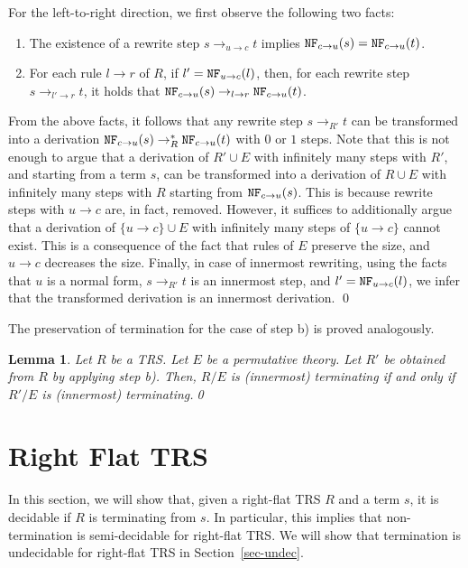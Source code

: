 \documentclass{LMCS}
\theoremstyle{plain}
\newtheorem{lemma}[thm]{Lemma}
\begin{document}
For the left-to-right direction, we first observe the
following two facts:
\begin{enumerate}[$\bullet$]
\item The existence of a rewrite step $s\to_{u\to c}t$ implies
${\tt NF}_{c\to u}(s)={\tt NF}_{c\to u}(t)$.
\item For each rule $l\to r$ of $R$, 
if $l'={\tt NF}_{u\to c}(l)$, then, for each rewrite step
$s\to_{l'\to r}t$, it holds that
${\tt NF}_{c\to u}(s)\to_{l\to r}{\tt NF}_{c\to u}(t)$.
\end{enumerate}
From the above facts, it follows that any rewrite step
$s\to_{R'}t$ can be transformed into a derivation 
${\tt NF}_{c\to u}(s)\to_R^* {\tt NF}_{c\to u}(t)$
with $0$ or $1$ steps. Note that this is not enough to
argue that a derivation of $R'\cup E$ with infinitely
many steps with $R'$, and starting
from a term $s$, can be transformed into a derivation
of $R\cup E$ with infinitely many steps with $R$ starting
from ${\tt NF}_{c\to u}(s)$. This is because
rewrite steps with $u\to c$ are, in fact, removed. 
However, it suffices to additionally argue that
a derivation of $\{u\to c\}\cup E$
with infinitely many steps of $\{u\to c\}$ cannot exist.
This is a consequence of the fact
that rules of $E$ preserve the size, and $u\to c$ decreases
the size.
Finally, in case of innermost rewriting, using the facts
that $u$ is a normal form, $s\to_{R'} t$ is an innermost
step, and $l' = {\tt NF}_{u\to c}(l)$, we infer that 
the transformed derivation is an innermost derivation.
\qed


The preservation of termination for the case of step b)
is proved analogously.

\begin{lemma}\label{lemma-simplifying3}
Let $R$ be a TRS. Let $E$ be a permutative theory.
Let $R'$ be obtained from $R$ by applying step b).
Then, $R/E$ is (innermost) terminating if and only if $R'/E$
is (innermost) terminating.\qed
\end{lemma}


\section{Right Flat TRS}\label{sec-right-flat}



\noindent In this section, we will show that, given a 
right-flat TRS $R$ and a term $s$,
it is decidable if $R$ is terminating from $s$.
In particular, this implies that
non-termination is semi-decidable for
right-flat TRS.
We will show that termination is undecidable
for right-flat TRS in Section~\ref{sec-undec}.
\end{document}

